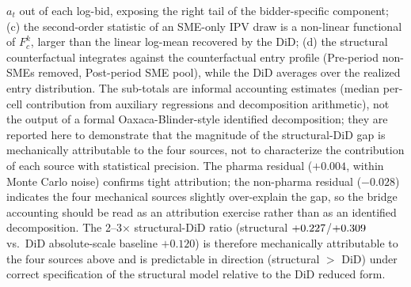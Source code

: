 \begin{table}[htbp]
\begin{threeparttable}
\begin{tablenotes}
$a_t$ out of each log-bid, exposing the right tail of the bidder-specific
component; (c) the second-order statistic of an SME-only IPV draw is a
non-linear functional of $F_c^k$, larger than the linear log-mean recovered
by the DiD; (d) the structural counterfactual integrates against the
counterfactual entry profile (Pre-period non-SMEs removed, Post-period SME
pool), while the DiD averages over the realized entry distribution. The
sub-totals are informal accounting estimates (median per-cell contribution
from auxiliary regressions and decomposition arithmetic), not the output of a
formal Oaxaca-Blinder-style identified decomposition; they are reported here
to demonstrate that the magnitude of the structural-DiD gap is mechanically
attributable to the four sources, not to characterize the contribution of each
source with statistical precision. The pharma residual ($+0.004$, within
Monte Carlo noise) confirms tight attribution; the non-pharma residual
($-0.028$) indicates the four mechanical sources slightly over-explain the
gap, so the bridge accounting should be read as an attribution exercise
rather than as an identified decomposition. The 2--3$\times$ structural-DiD
ratio (structural $+0.227$/$+0.309$ vs.\ DiD
absolute-scale baseline $+0.120$) is therefore mechanically attributable
to the four sources above and is predictable in direction (structural $>$
DiD) under correct specification of the structural model relative to the
DiD reduced form.
\end{tablenotes}
\end{threeparttable}
\end{table}
